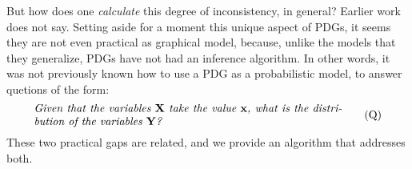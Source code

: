 \documentclass[twoside]{article}
\begin{document}
% 
%


But how does one \emph{calculate} this degree of inconsistency, in general?
Earlier work does not say. 
%
Setting aside for a moment this unique aspect
of PDGs,
it seems they are not 
even practical as graphical model, because, unlike the models that they 
generalize, 
PDGs have not had an inference algorithm.
In other words, it was not previously known how to use a PDG
as a probabilistic model,
to answer quetions of the form:
\begin{equation}
    \begin{minipage}{0.80\linewidth}
    \it Given that the variables $\mat X$ take the value $\mat x$, 
    what is the distribution of the variables $\mat Y$? 
    \end{minipage}
    \tag{Q}
    \label{q:inf}
\end{equation}
%
These two practical gaps 
are related, and we provide an algorithm
that addresses both.
\end{document}
